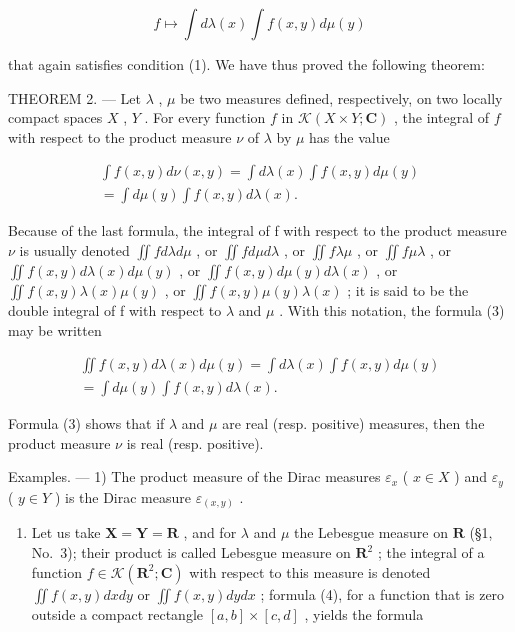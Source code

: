 \[
f \mapsto \int d \lambda (x) \int f (x, y) d \mu (y)
\]

that again satisfies condition (1). We have thus proved the following theorem:

THEOREM 2. --- Let \(\lambda\) , \(\mu\) be two measures defined, respectively, on two locally compact spaces \(X\) , \(Y\) . For every function \(f\) in \(\mathcal{K}(X \times Y; \mathbf{C})\) , the integral of \(f\) with respect to the product measure \(\nu\) of \(\lambda\) by \(\mu\) has the value

\[
\begin{array}{c} \int f (x, y) d \nu (x, y) = \int d \lambda (x) \int f (x, y) d \mu (y) \\ = \int d \mu (y) \int f (x, y) d \lambda (x). \end{array}\tag{3}
\]

Because of the last formula, the integral of f with respect to the product measure \(\nu\) is usually denoted \(\iint f d\lambda d\mu\) , or \(\iint f d\mu d\lambda\) , or \(\iint f \lambda \mu\) , or \(\iint f \mu \lambda\) , or \(\iint f(x, y) d\lambda(x) d\mu(y)\) , or \(\iint f(x, y) d\mu(y) d\lambda(x)\) , or \(\iint f(x, y) \lambda(x)\mu(y)\) , or \(\iint f(x, y) \mu(y)\lambda(x)\) ; it is said to be the double integral of f with respect to \(\lambda\) and \(\mu\) . With this notation, the formula (3) may be written

\[
\begin{array}{c} \iint f (x, y) d \lambda (x) d \mu (y) = \int d \lambda (x) \int f (x, y) d \mu (y) \\ = \int d \mu (y) \int f (x, y) d \lambda (x). \end{array}\tag{4}
\]

Formula (3) shows that if \(\lambda\) and \(\mu\) are real (resp. positive) measures, then the product measure \(\nu\) is real (resp. positive).

Examples. --- 1) The product measure of the Dirac measures \(\varepsilon_{x}\) ( \(x \in X\) ) and \(\varepsilon_{y}\) ( \(y \in Y\) ) is the Dirac measure \(\varepsilon_{(x,y)}\) .

\begin{enumerate}
\def\labelenumi{\arabic{enumi})}
\setcounter{enumi}{1}
\tightlist
\item
  Let us take \(\mathbf{X} = \mathbf{Y} = \mathbf{R}\) , and for \(\lambda\) and \(\mu\) the Lebesgue measure on \(\mathbf{R}\) (§1, No.~3); their product is called Lebesgue measure on \(\mathbf{R}^2\) ; the integral of a function \(f \in \mathcal{K}(\mathbf{R}^2; \mathbf{C})\) with respect to this measure is denoted \(\iint f(x, y) dx dy\) or \(\iint f(x, y) dy dx\) ; formula (4), for a function that is zero outside a compact rectangle \([a, b] \times [c, d]\) , yields the formula
\end{enumerate}

